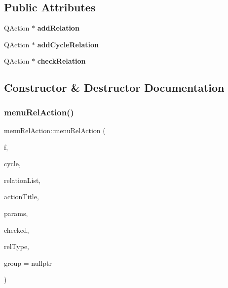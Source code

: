 \subsection*{Public Attributes}
\begin{DoxyCompactItemize}
\item 
\mbox{\label{classmenu_rel_action_ad9c9c61008821fcef78633ed38b42f8c}} 
Q\+Action $\ast$ {\bfseries add\+Relation}
\item 
\mbox{\label{classmenu_rel_action_ab78b5ed63bee30881b70110161670fb5}} 
Q\+Action $\ast$ {\bfseries add\+Cycle\+Relation}
\item 
\mbox{\label{classmenu_rel_action_afa273b825fbdc2d887cc6a3ecfc62265}} 
Q\+Action $\ast$ {\bfseries check\+Relation}
\end{DoxyCompactItemize}


\subsection{Constructor \& Destructor Documentation}
\mbox{\label{classmenu_rel_action_a2db14a6cd576e8cb645a0e1dcf584d4e}} 
\subsubsection{\texorpdfstring{menu\+Rel\+Action()}{menuRelAction()}}
{\footnotesize\ttfamily menu\+Rel\+Action\+::menu\+Rel\+Action (\begin{DoxyParamCaption}\item[{Moeb\+Inv\+::figure $\ast$}]{f,  }\item[{Moeb\+Inv\+::ex}]{cycle,  }\item[{Gi\+Na\+C\+::lst $\ast$}]{relation\+List,  }\item[{Q\+String}]{action\+Title,  }\item[{int}]{params,  }\item[{bool}]{checked,  }\item[{int}]{rel\+Type,  }\item[{\mbox{\hyperlink{classmenu_rel_action_group}{menu\+Rel\+Action\+Group}} $\ast$}]{group = {\ttfamily nullptr} }\end{DoxyParamCaption})}



